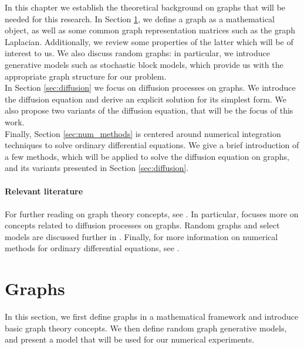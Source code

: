\documentclass[12pt, oneside]{report}   	%
\begin{document}
In this chapter we establish the theoretical background on graphs that will be needed for this research. In Section \ref{sec:graphs}, we define a graph as a mathematical object, as well as some common graph representation matrices such as the graph Laplacian. Additionally, we review some properties of the latter which will be of interest to us. We also discuss random graphs: in particular, we introduce generative models such as stochastic block models, which provide us with the appropriate graph structure for our problem.\\
In Section \ref{sec:diffusion} we focus on diffusion processes on graphs. We introduce the diffusion equation and derive an explicit solution for its simplest form. We also propose two variants of the diffusion equation, that will be the focus of this work.\\
Finally, Section \ref{sec:num_methods} is centered around numerical integration techniques to solve ordinary differential equations. We give a brief introduction of a few methods, which will be applied to solve the diffusion equation on graphs, and its variants presented in Section \ref{sec:diffusion}.\\\\
\textbf{Relevant literature}\\\\
For further reading on graph theory concepts, see \cite{gross2018graph, Newman2010}. In particular, \cite{Newman2010} focuses more on concepts related to diffusion processes on graphs. Random graphs and select models are discussed further in \cite{bollobas1998random, erdds1959random, holland1983stochastic}. Finally, for more information on numerical methods for ordinary differential equations, see \cite{burden2010numerical, butcher2016numerical, dormand1980family, bogacki19893, shampine1986some}.


\section{Graphs}
\label{sec:graphs}


In this section, we first define graphs in a mathematical framework and introduce basic graph theory concepts. We then define random graph generative models, and present a model that will be used for our numerical experiments.
\end{document}
